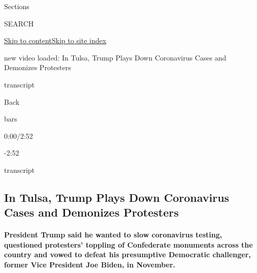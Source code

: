 Sections

SEARCH

\protect\hyperlink{site-content}{Skip to
content}\protect\hyperlink{site-index}{Skip to site index}

new video loaded: In Tulsa, Trump Plays Down Coronavirus Cases and
Demonizes Protesters

transcript

Back

bars

0:00/2:52

-2:52

transcript

\hypertarget{in-tulsa-trump-plays-down-coronavirus-cases-and-demonizes-protesters}{%
\subsection{In Tulsa, Trump Plays Down Coronavirus Cases and Demonizes
Protesters}\label{in-tulsa-trump-plays-down-coronavirus-cases-and-demonizes-protesters}}

\hypertarget{president-trump-said-he-wanted-to-slow-coronavirus-testing-questioned-protesters-toppling-of-confederate-monuments-across-the-country-and-vowed-to-defeat-his-presumptive-democratic-challenger-former-vice-president-joe-biden-in-november}{%
\paragraph{President Trump said he wanted to slow coronavirus testing,
questioned protesters' toppling of Confederate monuments across the
country and vowed to defeat his presumptive Democratic challenger,
former Vice President Joe Biden, in
November.}\label{president-trump-said-he-wanted-to-slow-coronavirus-testing-questioned-protesters-toppling-of-confederate-monuments-across-the-country-and-vowed-to-defeat-his-presumptive-democratic-challenger-former-vice-president-joe-biden-in-november}}

